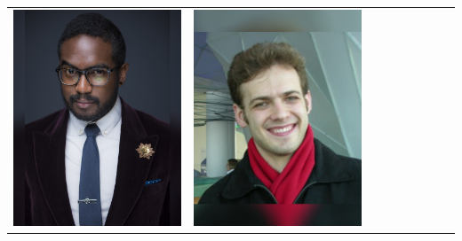 \documentclass[landscape,a0paper,fontscale=0.292]{baposter}
\begin{document}
\begin{poster}
{\begin{center}
\begin{tabularx}{\linewidth}{X X X X X X X X X}
{\centering \includegraphics[width=0.65\linewidth]{welch.jpg}}&
{\centering \includegraphics[width=0.65\linewidth]{yershov.jpg}}&

\end{tabularx}
\end{center}}
\end{poster}
\end{document}
